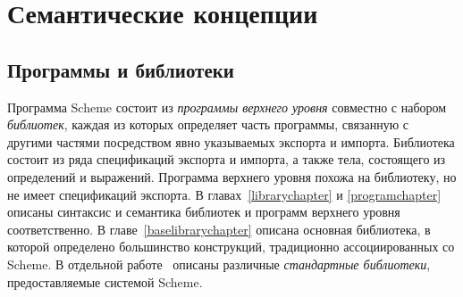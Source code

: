 \chapter{Семантические концепции}
\label{basicchapter}

\section{Программы и библиотеки}

Программа Scheme состоит из \textit{программы верхнего уровня} совместно с
набором \textit{библиотек}, каждая из которых определяет часть программы, связанную
с другими частями посредством явно указываемых экспорта и импорта. Библиотека состоит из ряда
спецификаций экспорта и импорта, а также тела, состоящего из определений и выражений. Программа
верхнего уровня похожа на библиотеку, но не имеет спецификаций
экспорта. В главах~\ref{librarychapter} и \ref{programchapter} описаны синтаксис и семантика
библиотек и программ верхнего уровня соответственно. В главе~\ref {baselibrarychapter} описана
основная библиотека, в которой определено большинство конструкций, традиционно ассоциированных со
Scheme. В отдельной работе~\cite{R6RS-libraries} описаны различные \textit{стандартные
библиотеки},  предоставляемые системой Scheme.

